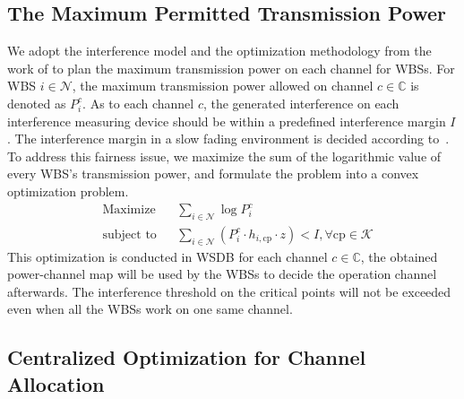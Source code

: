 \documentclass[times]{ettauth}
\theoremstyle{mytheoremstyle}
\theoremstyle{mytheoremstyle}
\theoremstyle{mytheoremstyle}
\begin{document}
\subsection{The Maximum Permitted Transmission Power}
\label{powermap}

We adopt the interference model and the optimization methodology from the work of \cite{multipleIntf_pimrc11} to plan the maximum transmission power on each channel for WBSs.
%
For WBS $i\in \mathcal{N}$, the maximum transmission power allowed on channel $c\in \mathbb{C}$ is denoted as $P_i^c$. 
As to each channel $c$, the generated interference on each interference measuring device should be within a predefined interference margin $I$.
The interference margin in a slow fading environment is decided according to~\cite{aggregate_interference_shadow_fading_2010}.
To address this fairness issue, we maximize the sum of the logarithmic value of every WBS's transmission power, and formulate the problem into a convex optimization problem.
	\begin{equation}
		\label{cvx}
		\begin{aligned}
		& {\text{Maximize}}
		& & \sum_{i\in \mathcal{N}} \log P^c_i \\
		& \text{subject to}
		& & \sum_{i\in \mathcal{N}} (P^c_i \cdot h_{i,\text{cp}}\cdot z) < I, \forall\text{cp} \in \mathcal{K}
		\end{aligned}
	\end{equation}
This optimization is conducted in WSDB for each channel $c\in \mathbb{C}$, the obtained power-channel map will be used by the WBSs to decide the operation channel afterwards.
The interference threshold on the critical points will not be exceeded even when all the WBSs work on one same channel.



\subsection{Centralized Optimization for Channel Allocation}
\label{03_centralized_ca}
\end{document}
